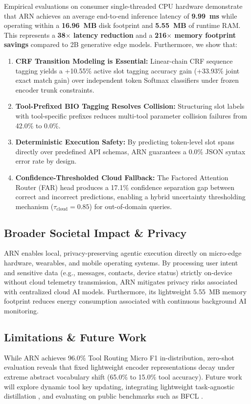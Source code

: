 \documentclass[letterpaper]{article} %
\begin{document}
Empirical evaluations on consumer single-threaded CPU hardware demonstrate that ARN achieves an average end-to-end inference latency of \textbf{9.99~ms} while operating within a \textbf{16.96~MB} disk footprint and \textbf{5.55~MB} of runtime RAM. This represents a \textbf{38$\times$ latency reduction} and a \textbf{216$\times$ memory footprint savings} compared to 2B generative edge models. Furthermore, we show that:
\begin{enumerate}
    \item \textbf{CRF Transition Modeling is Essential:} Linear-chain CRF sequence tagging yields a +10.55\% active slot tagging accuracy gain (+33.93\% joint exact match gain) over independent token Softmax classifiers under frozen encoder trunk constraints.
    \item \textbf{Tool-Prefixed BIO Tagging Resolves Collision:} Structuring slot labels with tool-specific prefixes reduces multi-tool parameter collision failures from 42.0\% to 0.0\%.
    \item \textbf{Deterministic Execution Safety:} By predicting token-level slot spans directly over predefined API schemas, ARN guarantees a 0.0\% JSON syntax error rate by design.
    \item \textbf{Confidence-Thresholded Cloud Fallback:} The Factored Attention Router (FAR) head produces a 17.1\% confidence separation gap between correct and incorrect predictions, enabling a hybrid uncertainty thresholding mechanism ($\tau_{\text{cloud}} = 0.85$) for out-of-domain queries.
\end{enumerate}

\subsection{Broader Societal Impact \& Privacy}
ARN enables local, privacy-preserving agentic execution directly on micro-edge hardware, wearables, and mobile operating systems. By processing user intent and sensitive data (e.g., messages, contacts, device status) strictly on-device without cloud telemetry transmission, ARN mitigates privacy risks associated with centralized cloud AI models. Furthermore, its lightweight 5.55~MB memory footprint reduces energy consumption associated with continuous background AI monitoring.

\subsection{Limitations \& Future Work}
While ARN achieves 96.0\% Tool Routing Micro F1 in-distribution, zero-shot evaluation reveals that fixed lightweight encoder representations decay under extreme abstract vocabulary shift (65.0\% to 15.0\% tool accuracy). Future work will explore dynamic tool key updating, integrating lightweight task-agnostic distillation \citep{sun2020mobilebert}, and evaluating on public benchmarks such as BFCL \citep{patil2025berkeley}.


\end{document}
